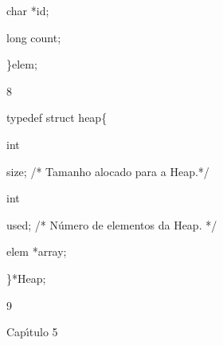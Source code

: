\documentclass[a4paper,portrait,12pt]{article}
\begin{document}
\begin{flushleft}
char *id;
\end{flushleft}


\begin{flushleft}
long count;
\end{flushleft}


\begin{flushleft}
\}elem;
\end{flushleft}





8





\begin{flushleft}
\newpage
typedef struct heap\{
\end{flushleft}


\begin{flushleft}
int
\end{flushleft}





\begin{flushleft}
size; /* Tamanho alocado para a Heap.*/
\end{flushleft}





\begin{flushleft}
int
\end{flushleft}





\begin{flushleft}
used; /* Número de elementos da Heap. */
\end{flushleft}





\begin{flushleft}
elem *array;
\end{flushleft}


\begin{flushleft}
\}*Heap;
\end{flushleft}





9





\begin{flushleft}
\newpage
Cap\i{}́tulo 5
\end{flushleft}
\end{document}
